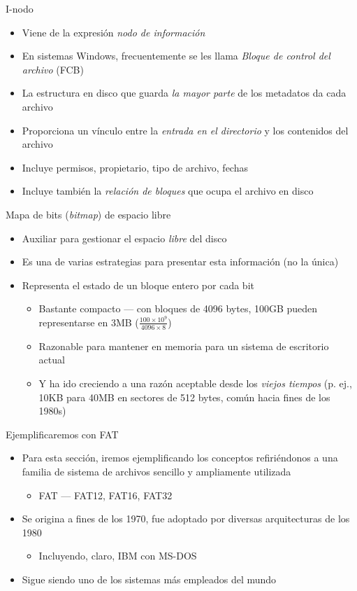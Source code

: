 \documentclass[presentation]{beamer}
\begin{document}
\begin{frame}[label={sec:org0c84faf}]{I-nodo}
\begin{itemize}
\item Viene de la expresión \emph{nodo de información}
\item En sistemas Windows, frecuentemente se les llama \emph{Bloque de control
del archivo} (FCB)
\item La estructura en disco que guarda \emph{la mayor parte} de los metadatos
da cada archivo
\item Proporciona un vínculo entre la \emph{entrada en el directorio} y los
contenidos del archivo
\item Incluye permisos, propietario, tipo de archivo, fechas
\item Incluye también la \emph{relación de bloques} que ocupa el archivo en
disco
\end{itemize}
\end{frame}

\begin{frame}[label={sec:org2429633}]{Mapa de bits (\emph{bitmap}) de espacio libre}
\begin{itemize}
\item Auxiliar para gestionar el espacio \emph{libre} del disco
\item Es una de varias estrategias para presentar esta información (no la
única)
\item Representa el estado de un bloque entero por cada bit
\begin{itemize}
\item Bastante compacto — con bloques de 4096 bytes, 100GB pueden
representarse en 3MB (\(\frac{100 \times 10^9}{4096 \times 8}\))
\item Razonable para mantener en memoria para un sistema de escritorio
actual
\item Y ha ido creciendo a una razón aceptable desde los \emph{viejos
tiempos} (p. ej., 10KB para 40MB en sectores de 512 bytes, común
hacia fines de los 1980s)
\end{itemize}
\end{itemize}
\end{frame}


\begin{frame}[label={sec:orgfba29b6}]{Ejemplificaremos con FAT}
\begin{itemize}
\item Para esta sección, iremos ejemplificando los conceptos
refiriéndonos a una familia de sistema de archivos sencillo y
ampliamente utilizada
\begin{itemize}
\item FAT — FAT12, FAT16, FAT32
\end{itemize}
\item Se origina a fines de los 1970, fue adoptado por diversas
arquitecturas de los 1980
\begin{itemize}
\item Incluyendo, claro, IBM con MS-DOS
\end{itemize}
\item Sigue siendo uno de los sistemas más empleados del mundo
\end{itemize}
\end{frame}
\end{document}
